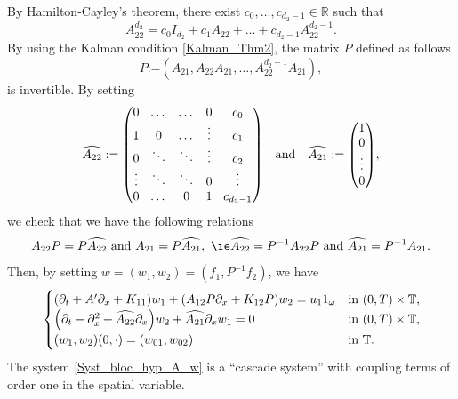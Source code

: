 \documentclass[JEP,XML,SOM,Unicode,NoEqCountersInSection]{cedram}
\theoremstyle{plain}
\theoremstyle{definition}
\theoremstyle{remark}
\newcommand{\set}{\mathbb}
\newcommand{\R}{} %
\renewcommand{\R}{\set{R}}
\newcommand{\T}{\set{T}}
\newcommand{\coloneqq}{\mathrel{\mathord{:}\mathord=}}
\let\originalleft\left
\let\originalright\right
\renewcommand{\left}{\mathopen{}\mathclose\bgroup\originalleft}
\renewcommand{\right}{\aftergroup\egroup\originalright}
\begin{document}
By Hamilton-Cayley's theorem, there exist $c_0, \dots, c_{d_2-1} \in \R$ such that
\[
A_{22}^{d_2} = c_0 I_{d_2} + c_1 A_{22} + \dots + c_{d_2-1} A_{22}^{d_2-1}.
\]
By using the Kalman condition \eqref{Kalman_Thm2}, the matrix $P$ defined as follows
\[
P \coloneqq (A_{21}, A_{22} A_{21}, \dots, A_{22}^{d_2-1} A_{21}),
\]
is invertible. By setting
\begin{equation}
\label{eq:cascade}\arraycolsep4.5pt
\widehat{A_{22}} \coloneqq \begin{pmatrix} 0 & \dots & \dots & 0 & c_0\\
1 & 0 &\dots & \vdots & c_1\\
0 & \ddots & \ddots & \vdots & c_2\\
\vdots & \ddots & \ddots & 0 & \vdots\\
0 & \dots &0 & 1 & c_{d_2-1}
\end{pmatrix}\quad \text{and}\quad \widehat{A_{21}} \coloneqq \begin{pmatrix} 1\\0\\ \vdots\\ 0 \end{pmatrix},
\end{equation}
we check that we have the following relations
\[
A_{22}P = P \widehat{A_{22}}\ \text{and}\ A_{21} = P \widehat{A_{21}},\ \text{\ie} \widehat{A_{22}} = P^{-1} A_{22} P\ \text{and}\ \widehat{A_{21}} = P^{-1} A_{21}.
\]
Then, by setting $w =(w_1,w_2) = (f_1,P^{-1}f_2)$, we have
\begin{equation} \label{Syst_bloc_hyp_A_w}
\begin{cases}
\left(\partial_t +A'\partial_x+K_{11}\right)w_1+\left(A_{12}P\partial_x+K_{12}P\right)w_2= u_1 1_\omega
&\text{in}\ (0,T)\times \T,\!\\
\left(\partial_t - \partial_x^2+\widehat{A_{22}}\partial_x\right)w_2 + \widehat{A_{21}}\partial_x w_1 = 0 &\text{in}\ (0,T)\times \T,\!\\
(w_1,w_2)(0,\cdot)=(w_{01},w_{02}) & \text{in}\ \T.
\end{cases}
\end{equation}
The system \eqref{Syst_bloc_hyp_A_w} is a “cascade system” with coupling terms of order one in the spatial variable.
\end{document}
